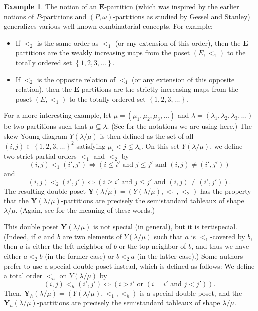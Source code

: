 \documentclass[12pt]{article}
\theoremstyle{plain}
\theoremstyle{definition}
\newtheorem{example}[theorem]{Example}
\theoremstyle{remark}
\newcommand{\EE}{{\mathbf{E}}}
\begin{document}
\begin{example}
\label{exam.dp}
The notion of an $\EE$-partition (which was inspired by the earlier
notions of $P$-partitions and $\left(P,\omega\right)$-partitions
as studied by Gessel and Stanley\footnotemark)
generalizes various well-known
combinatorial concepts. For example:
\begin{itemize}
\item If $<_2$ is the same order
as $<_1$ (or any extension of this order), then the
$\EE$-partitions are the weakly increasing maps from the poset
$\left(E, <_1\right)$ to the totally ordered set
$\left\{1, 2, 3, \ldots\right\}$.
\item If $<_2$ is the opposite relation of
$<_1$ (or any extension of this opposite relation), then the
$\EE$-partitions are the strictly increasing maps from the
poset $\left(E, <_1\right)$ to the totally ordered set
$\left\{1, 2, 3, \ldots\right\}$.
\end{itemize}

For a more interesting example,
let $\mu = \left(\mu_1, \mu_2, \mu_3, \ldots\right)$ and
$\lambda = \left(\lambda_1, \lambda_2, \lambda_3, \ldots\right)$ be
two partitions such that $\mu \subseteq \lambda$.
(See \cite[\S 2]{Reiner} for the notations we are using
here.)
The skew Young
diagram $Y\left(\lambda / \mu\right)$ is then defined as the set of all
$\left(i, j\right) \in \left\{ 1, 2, 3, \ldots \right\}^2$ satisfying
$\mu_i < j \leq \lambda_i$. On this set $Y\left(\lambda / \mu\right)$,
we define two strict partial orders $<_1$ and $<_2$ by
\[
\left(i,j\right) <_1 \left(i',j'\right) \Longleftrightarrow
\left( i \leq i' \text{ and } j \leq j' \text{ and }
\left(i,j\right) \neq \left(i',j'\right) \right)
\]
and
\[
\left(i,j\right) <_2 \left(i',j'\right) \Longleftrightarrow
\left( i \geq i' \text{ and } j \leq j' \text{ and }
\left(i,j\right) \neq \left(i',j'\right) \right) .
\]
The resulting double poset
$\mathbf{Y}\left(\lambda / \mu\right)
= \left(Y\left(\lambda / \mu\right), <_1, <_2\right)$ has the
property that the $\mathbf{Y}\left(\lambda / \mu\right)$-partitions
are precisely the semistandard tableaux of shape
$\lambda / \mu$. (Again, see \cite[\S 2]{Reiner} for the meaning
of these words.)

This double poset $\mathbf{Y}\left(\lambda / \mu\right)$
is not special (in general), but it is tertispecial. (Indeed,
if $a$ and $b$ are two elements of $Y\left(\lambda / \mu\right)$
such that $a$ is $<_1$-covered by $b$, then $a$ is either the left
neighbor of $b$ or the top neighbor of $b$, and thus we have
either $a <_2 b$ (in the former case) or $b <_2 a$ (in the latter
case).) Some authors prefer to use a special double poset instead,
which is defined as follows: We define a total
order $<_h$ on $Y\left(\lambda / \mu\right)$ by
\[
\left(i,j\right) <_h \left(i',j'\right) \Longleftrightarrow
\left( i > i' \text{ or } \left( i = i' \text{ and }
j < j' \right) \right) .
\]
Then, $\mathbf{Y}_h\left(\lambda / \mu\right)
= \left(Y\left(\lambda / \mu\right), <_1, <_h\right)$ is a special
double poset, and the
$\mathbf{Y}_h\left(\lambda / \mu\right)$-partitions
are precisely the semistandard tableaux of shape
$\lambda / \mu$.
\end{example}
\end{document}
